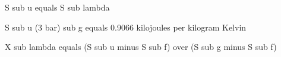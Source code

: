 S sub u equals S sub lambda

S sub u (3 bar) sub g equals 0.9066 kilojoules per kilogram Kelvin

X sub lambda equals (S sub u minus S sub f) over (S sub g minus S sub f)